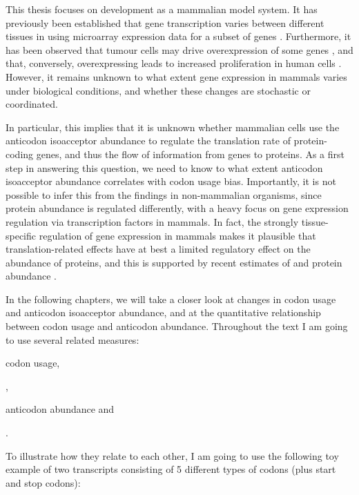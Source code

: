 This thesis focuses on \mmu development as a mammalian model system. It has
previously been established that \trna gene transcription varies between
different tissues in \hsa using microarray expression data for a subset of \trna
genes \citep{Dittmar:2006}. Furthermore, it has been observed that tumour cells
may drive overexpression of some \trna genes
\citep{Winter:2000,Pavon-Eternod:2009}, and that, conversely, overexpressing
 leads to increased proliferation in human cells
\citep{Pavon-Eternod:2013}. However, it remains unknown to what extent \trna
gene expression in mammals varies under biological conditions, and whether these
changes are stochastic or coordinated.

In particular, this implies that it is unknown whether mammalian cells use the
\trna anticodon isoacceptor abundance to regulate the translation rate of
protein-coding genes, and thus the flow of information from genes to proteins.
As a first step in answering this question, we need to know to what extent \trna
anticodon isoacceptor abundance correlates with codon usage bias. Importantly,
it is not possible to infer this from the findings in non-mammalian organisms,
since protein abundance is regulated differently, with a heavy focus on gene
expression regulation via transcription factors in mammals. In fact, the
strongly tissue-specific regulation of gene expression in mammals makes it
plausible that translation-related effects have at best a limited regulatory
effect on the abundance of proteins, and this is supported by recent estimates
of \mrna and protein abundance \citep{Li:2014,Csardi:2014,Jovanovic:2015}.

In the following chapters, we will take a closer look at changes in codon usage
and \trna anticodon isoacceptor abundance, and at the quantitative relationship
between codon usage and anticodon abundance. Throughout the text I am going to
use several related measures:

\begin{shortenumerate}
    \item codon usage,
    \item \rcu,
    \item anticodon abundance and
    \item \raa.
\end{shortenumerate}

To illustrate how they relate to each other, I am going to use the following toy
example of two transcripts consisting of \num{5} different types of codons (plus
start and stop codons):

